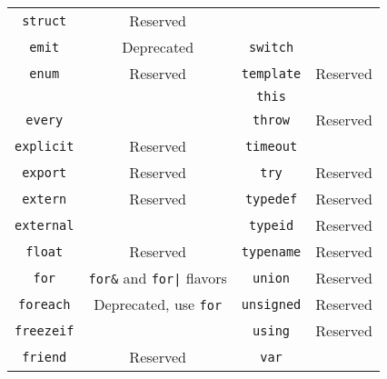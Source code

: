 \begin{table}[\floatpos]
\begin{tabular}{|c|c||c|c|}
    \lstinline"struct"            & Reserved                                \\
    \lstinline"emit"              & Deprecated                              &
    \lstinline"switch"            &                                         \\
    \lstinline"enum"              & Reserved                                &
    \lstinline"template"          & Reserved                                \\
                                  &                                         &
    \lstinline"this"              &                                         \\
    \lstinline"every"             &                                         &
    \lstinline"throw"             & Reserved                                \\
    \lstinline"explicit"          & Reserved                                &
    \lstinline"timeout"           &                                         \\
    \lstinline"export"            & Reserved                                &
    \lstinline"try"               & Reserved                                \\
    \lstinline"extern"            & Reserved                                &
    \lstinline"typedef"           & Reserved                                \\
    \lstinline"external"          &                                         &
    \lstinline"typeid"            & Reserved                                \\
    \lstinline"float"             & Reserved                                &
    \lstinline"typename"          & Reserved                                \\
    \lstinline"for"               & \lstinline|for&| and \lstinline-for|- flavors&
    \lstinline"union"             & Reserved                                \\
    \lstinline"foreach"           & Deprecated, use \lstinline|for|    &
    \lstinline"unsigned"          & Reserved                                \\
    \lstinline"freezeif"          &                                         &
    \lstinline"using"             & Reserved                                \\
    \lstinline"friend"            & Reserved                                &
    \lstinline"var"               &                                         \\

\end{tabular}
\end{table}
